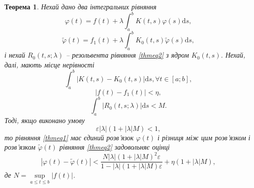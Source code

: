 \documentclass[14pt,twoside]{extreport}
\theoremstyle{mystyle}
\newtheorem{thm}{Теорема}
\numberwithin{equation}{chapter}
\begin{document}
\begin{thm}
	Нехай дано два інтегральних рівняння
	\begin{equation}\label{thmeq1}
	\varphi(t) = f(t) + \lambda \int_{a}^{b} K(t, s) \varphi(s) \mathrm{d}s,
	\end{equation}
	\begin{equation}\label{thmeq2}
	\tilde{\varphi}(t) = f_1(t) + \lambda \int_{a}^{b} K_0(t, s) \tilde{\varphi}(s) \mathrm{d}s,
	\end{equation}
	і нехай $R_0(t, s; \lambda)$ -- резольвента рівняння \eqref{thmeq2} з ядром $K_0(t, s)$. Нехай, далі, мають місце нерівності
	\begin{equation}
	\int_{a}^{b} |K(t, s) - K_0(t, s)| \mathrm{d}s, \forall t \in[a; b],
	\end{equation}
	\begin{equation}
	|f(t) - f_1(t)| < \eta,
	\end{equation}
	\begin{equation}\label{r0est}
	\int_{a}^{b} |R_0 (t, s; \lambda)|\mathrm{d}s <M.
	\end{equation}
	Тоді, якщо виконано умову
	\begin{equation}\label{epslambda}
	\varepsilon |\lambda| (1+ |\lambda|M) < 1,
	\end{equation}
	то рівняння \eqref{thmeq1} має єдиний розв'язок $\varphi(t)$ і різниця між цим розв'язком і розв'язком $\tilde{\varphi}(t)$ рівняння \eqref{thmeq2} задовольняє оцінці
	\begin{equation}\label{diffest}
	|\varphi(t) - \tilde{\varphi}(t)| < \frac{N|\lambda|(1+|\lambda|M)^2\varepsilon}{1-|\lambda|(1+|\lambda|M)\varepsilon} + \eta(1+|\lambda|M),
	\end{equation}
	де $N = \sup\limits_{a\leqslant t \leqslant b} |f(t)|$.
\end{thm}
\end{document}
